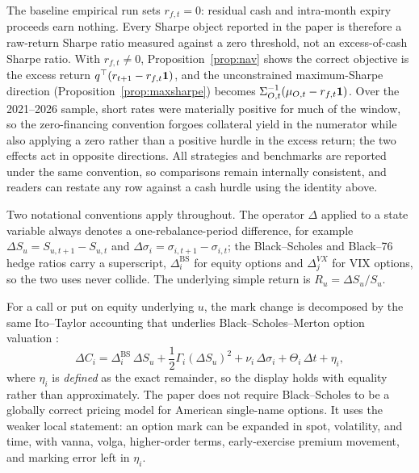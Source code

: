 \begin{remark}\label{rem:zero_financing}
The baseline empirical run sets \(r_{f,t}=0\): residual cash and intra-month expiry
proceeds earn nothing. Every Sharpe object reported in the paper is therefore a raw-return
Sharpe ratio measured against a zero threshold, not an excess-of-cash Sharpe ratio. With
\(r_{f,t}\neq0\), Proposition~\ref{prop:nav} shows the correct objective is the excess
return \(q^\top(r_{t+1}-r_{f,t}\mathbf{1})\), and the unconstrained maximum-Sharpe direction
(Proposition~\ref{prop:maxsharpe}) becomes
\(\Sigma_{O,t}^{-1}(\mu_{O,t}-r_{f,t}\mathbf{1})\). Over the 2021--2026 sample, short rates were
materially positive for much of the window, so the zero-financing convention forgoes
collateral yield in the numerator while also applying a zero rather than a positive hurdle
in the excess return; the two effects act in opposite directions. All strategies and
benchmarks are reported under the same convention, so comparisons remain internally
consistent, and readers can restate any row against a cash hurdle using the identity above.
\end{remark}

Two notational conventions apply throughout. The operator \(\Delta\) applied to a state
variable always denotes a one-rebalance-period difference, for example
\(\Delta S_u=S_{u,t+1}-S_{u,t}\) and \(\Delta\sigma_i=\sigma_{i,t+1}-\sigma_{i,t}\); the
Black--Scholes and Black--76 hedge ratios carry a superscript,
\(\Delta^{\mathrm{BS}}_i\) for equity options and \(\Delta^{VX}_j\) for VIX options, so the
two uses never collide. The underlying simple return is \(R_u=\Delta S_u/S_u\).

For a call or put on equity underlying \(u\), the mark change is decomposed by the same
Ito--Taylor accounting that underlies Black--Scholes--Merton option valuation
\citep{blackscholes1973,merton1973,shreve2004stochasticii}:
\[
  \Delta C_i
  =
  \Delta^{\mathrm{BS}}_i\,\Delta S_u
  +\frac12\Gamma_i(\Delta S_u)^2
  +\nu_i\,\Delta\sigma_i
  +\Theta_i\,\Delta t
  +\eta_i,
\]
where \(\eta_i\) is \emph{defined} as the exact remainder, so the display holds with
equality rather than approximately. The paper does not require Black--Scholes to be a
globally correct pricing model for American single-name options. It uses the weaker local
statement: an option mark can be expanded in spot, volatility, and time, with vanna, volga,
higher-order terms, early-exercise premium movement, and marking error left in \(\eta_i\).

